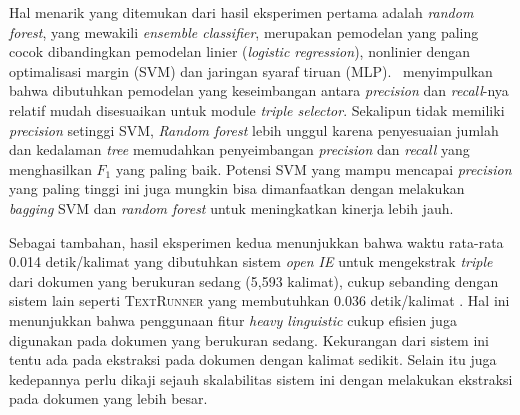 Hal menarik yang ditemukan dari hasil eksperimen pertama adalah \textit{random forest}, yang mewakili \textit{ensemble classifier}, merupakan pemodelan yang paling cocok dibandingkan pemodelan linier (\textit{logistic regression}), nonlinier dengan optimalisasi margin (SVM) dan jaringan syaraf tiruan (MLP). \saya~menyimpulkan bahwa dibutuhkan pemodelan yang keseimbangan antara \textit{precision} dan \textit{recall}-nya relatif mudah disesuaikan untuk module \textit{triple selector}. Sekalipun tidak memiliki \textit{precision} setinggi SVM, \textit{Random forest} lebih unggul karena penyesuaian jumlah dan kedalaman \textit{tree} memudahkan penyeimbangan \textit{precision} dan \textit{recall} yang menghasilkan $F_1$ yang paling baik. Potensi SVM yang mampu mencapai \textit{precision} yang paling tinggi ini juga mungkin bisa dimanfaatkan dengan melakukan \textit{bagging} \citep{breiman1996bagging} SVM dan \textit{random forest} untuk meningkatkan kinerja lebih jauh.



Sebagai tambahan, hasil eksperimen kedua menunjukkan bahwa waktu rata-rata 0.014 detik/kalimat yang dibutuhkan sistem \textit{open IE} untuk mengekstrak \textit{triple} dari dokumen yang berukuran sedang (5,593 kalimat), cukup sebanding dengan sistem lain seperti \textsc{TextRunner} yang membutuhkan 0.036 detik/kalimat \citep{banko2007open}. Hal ini menunjukkan bahwa penggunaan fitur \textit{heavy linguistic} cukup efisien juga digunakan pada dokumen yang berukuran sedang. Kekurangan dari sistem ini tentu ada pada ekstraksi pada dokumen dengan kalimat sedikit. Selain itu juga kedepannya perlu dikaji sejauh skalabilitas sistem ini dengan melakukan ekstraksi pada dokumen yang lebih besar.

